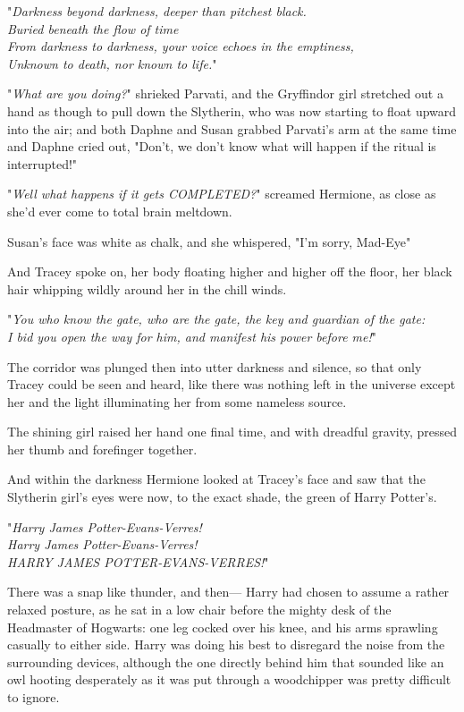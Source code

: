 "\emph{Darkness beyond darkness, deeper than pitchest black.\\
Buried beneath the flow of time{\el}\\
From darkness to darkness, your voice echoes in the emptiness,\\
Unknown to death, nor known to life.}"

"\emph{What are you doing?}" shrieked Parvati, and the Gryffindor girl
stretched out a hand as though to pull down the Slytherin, who was now starting
to float upward into the air; and both Daphne and Susan grabbed Parvati's arm
at the same time and Daphne cried out, "Don't, we don't know what will happen
if the ritual is interrupted!"

"\emph{Well what happens if it gets COMPLETED?}" screamed Hermione, as close as
she'd ever come to total brain meltdown.

Susan's face was white as chalk, and she whispered, "I'm sorry, Mad-Eye{\el}"

And Tracey spoke on, her body floating higher and higher off the floor, her
black hair whipping wildly around her in the chill winds.

"\emph{You who know the gate, who are the gate, the key and guardian of the
gate:\\
I bid you open the way for him, and manifest his power before me!}"

The corridor was plunged then into utter darkness and silence, so that only
Tracey could be seen and heard, like there was nothing left in the universe
except her and the light illuminating her from some nameless source.

The shining girl raised her hand one final time, and with dreadful gravity,
pressed her thumb and forefinger together.

And within the darkness Hermione looked at Tracey's face and saw that the
Slytherin girl's eyes were now, to the exact shade, the green of Harry Potter's.

"\emph{Harry James Potter-Evans-Verres!\\
Harry James Potter-Evans-Verres!\\
HARRY JAMES POTTER-EVANS-VERRES!}"

There was a snap like thunder, and then---
\sbreak
Harry had chosen to assume a rather relaxed posture, as he sat in a low chair
before the mighty desk of the Headmaster of Hogwarts: one leg cocked over his
knee, and his arms sprawling casually to either side. Harry was doing his best
to disregard the noise from the surrounding devices, although the one directly
behind him that sounded like an owl hooting desperately as it was put through a
woodchipper was pretty difficult to ignore.


